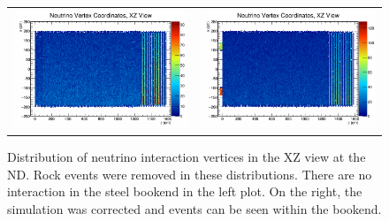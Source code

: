 \begin{figure}[htb]
  \centering
  \begin{tabular}{c c}
    \includegraphics[width=.47\textwidth]{figures/MCCO_NDWrong.png} &
    \includegraphics[width=.47\textwidth]{figures/MCCO_NDRight.png} \\
  \end{tabular}
  \caption[Identifying Missing Simulated Events in the ND]{Distribution of neutrino interaction vertices in the XZ view at the ND. Rock events were removed in these distributions. There are no interaction in the steel bookend in the left plot. On the right, the simulation was corrected and events can be seen within the bookend.}
  \label{fig:MCCO_ND}
\end{figure}